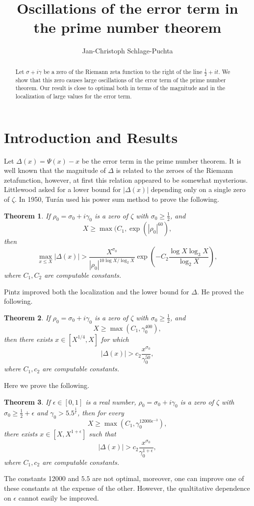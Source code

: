 \documentclass{amsart}
\newtheorem{Theo}{Theorem}
\begin{document}
\title{Oscillations of the error term in the prime number theorem}
\author[J.-C. Schlage-Puchta]{Jan-Christoph Schlage-Puchta}
\begin{abstract}
Let $\sigma+i\gamma$ be a zero of the Riemann zeta function to the right of the line $\frac{1}{2}+it$. We show that this zero causes large oscillations of the error term of the prime number theorem. Our result is close to optimal both in terms of the magnitude and in the localization of large values for the error term.
\end{abstract}
\maketitle
\section{Introduction and Results}
Let $\Delta(x)=\Psi(x)-x$ be the error term in the prime number theorem. It is well known that the magnitude of $\Delta$ is related to the zeroes of the Riemann zetafunction, however, at first this relation appeared to be somewhat mysterious. Littlewood\cite{Littlewood} asked for a lower bound for $|\Delta(x)|$ depending only on a single zero of $\zeta$. In 1950, Tur\'an\cite{Turan oscillation} used his power sum method to prove the following.
\begin{Theo}
\label{thm:Turan}
If $\rho_0=\sigma_0+i\gamma_0$ is a zero of $\zeta$ with $\sigma_0\geq\frac{1}{2}$, and 
\[
X\geq\max(C_1, \exp(|\rho_0|^{60}),
\]
then
\[
\max_{x\leq X}|\Delta(x)|>\frac{X^{\sigma_0}}{|\rho_0|^{10\log X/\log_2 X}}\exp\left(-C_2\frac{\log X\log_3 X}{\log_2 X}\right),
\]
where $C_1, C_2$ are computable constants.
\end{Theo}
Pintz\cite{Pintz} improved both the localization and the lower bound for $\Delta$. He proved the following.
\begin{Theo}
\label{thm:Pintz}
If $\rho_0=\sigma_0+i\gamma_0$ is a zero of $\zeta$ with $\sigma_0\geq\frac{1}{2}$, and 
\[
X\geq\max(C_1, \gamma_0^{400}),
\]
then there exists $x\in[X^{1/4}, X]$ for which
\[
|\Delta(x)|>c_2\frac{x^{\sigma_0}}{\gamma_0^{50}},
\]
where $C_1, c_2$ are computable constants.
\end{Theo}
Here we prove the following.
\begin{Theo}
\label{thm:main}
If $\epsilon\in[0, 1]$ is a real number, $\rho_0=\sigma_0+i\gamma_0$ is a zero of $\zeta$ with $\sigma_0\geq\frac{1}{2}+\epsilon$ and $\gamma_0>5.5^{\frac{1}{\epsilon}}$, then for every 
\[
X\geq\max(C_1, \gamma_0^{12000\epsilon^{-3}}),
\]
there exists $x\in[X, X^{1+\epsilon}]$ such that 
\[
|\Delta(x)|>c_2\frac{x^{\sigma_0}}{\gamma_0^{1+\epsilon}},
\]
where $C_1, c_2$ are computable constants.
\end{Theo}
The constants 12000 and $5.5$ are not optimal, moreover, one can improve one of these constants at the expense of the other. However, the qualtitative dependence on $\epsilon$ cannot easily be improved.
\end{document}
